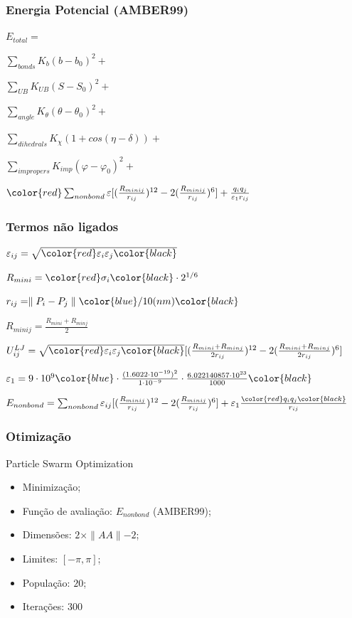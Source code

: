 \documentclass{beamer}
\begin{document}
\begin{frame}
\frametitle{Energia Potencial (AMBER99)}
$E_{total} = $

$\sum_{bonds} K_{b}(b - b_0)^2 + $

$\sum_{UB} K_{UB}(S - S_0)^2 + $

$\sum_{angle} K_{\theta}(\theta - \theta_0)^2 + $

$\sum_{dihedrals} K_{\chi}(1 + cos(\eta - \delta)) + $

$\sum_{impropers} K_{imp}(\varphi - \varphi_0)^2 + $

$\color{red}\sum_{nonbond} \varepsilon [(\frac{R_{minij}}{r_{ij}})^{12} -2(\frac{R_{minij}}{r_{ij}})^6] + \frac{q_i q_j}{\varepsilon_1 r_{ij}} $
\end{frame}

\begin{frame}
\frametitle{Termos não ligados}
$\varepsilon_{ij} = \sqrt{ \color{red} \varepsilon_i \varepsilon_j \color{black} }$

$R_{mini} = \color{red}\sigma_i \color{black} \cdot 2^{1/6}$

$r_{ij} = \parallel P_i - P_j \parallel \color{blue}/10 (nm) \color{black}$ 

$R_{minij} = \frac{R_{mini} + R_{minj}}{2}$

$U^{LJ}_{ij} = \sqrt{ \color{red} \varepsilon_i \varepsilon_j \color{black} } [(\frac{R_{mini} + R_{minj}}{2r_{ij}})^{12} -2(\frac{R_{mini} + R_{minj}}{2r_{ij}})^{6}]$

$\varepsilon_1 = 9 \cdot 10^9 \color{blue} \cdot \frac{(1.6022 \cdot 10^{-19})^2}{1 \cdot 10^{-9}} \cdot \frac{6.022140857 \cdot 10^{23}}{1000} \color{black}$

$E_{nonbond} = \sum_{nonbond} \varepsilon_{ij} [(\frac{R_{minij}}{r_{ij}})^{12} -2(\frac{R_{minij}}{r_{ij}})^6] + \varepsilon_1 \frac{\color{red}q_i q_j \color{black}}{r_{ij}}$
\end{frame}

\begin{frame}
\frametitle{Otimização}
Particle Swarm Optimization
\begin{itemize}
  \item Minimização;
  \item Função de avaliação: $E_{nonbond}$ (AMBER99);
  \item Dimensões: $2 \times \parallel AA \parallel - 2$;
  \item Limites: $[-\pi, \pi]$;
  \item População: $20$;
  \item Iterações: $300$
\end{itemize}
\end{frame}
\end{document}
